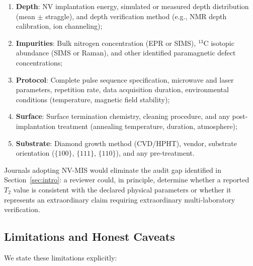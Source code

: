 \documentclass[11pt,a4paper]{article}
\theoremstyle{definition}
\newcommand{\Ttwo}{T_2}
\newcommand{\NV}{NV}
\begin{document}
\begin{enumerate}[label=\textbf{MIS-\arabic*:}, nosep]
    \item \textbf{Depth}: \NV{} implantation energy, simulated or measured
    depth distribution (mean $\pm$ straggle), and depth verification method
    (e.g., NMR depth calibration, ion channeling);
    \item \textbf{Impurities}: Bulk nitrogen concentration (EPR or SIMS),
    ${}^{13}$C isotopic abundance (SIMS or Raman), and other identified
    paramagnetic defect concentrations;
    \item \textbf{Protocol}: Complete pulse sequence specification, microwave
    and laser parameters, repetition rate, data acquisition duration,
    environmental conditions (temperature, magnetic field stability);
    \item \textbf{Surface}: Surface termination chemistry, cleaning procedure,
    and any post-implantation treatment (annealing temperature, duration,
    atmosphere);
    \item \textbf{Substrate}: Diamond growth method (CVD/HPHT), vendor,
    substrate orientation ($\{100\}$, $\{111\}$, $\{110\}$), and any
    pre-treatment.
\end{enumerate}

Journals adopting NV-MIS would eliminate the audit gap identified in
Section~\ref{sec:intro}: a reviewer could, in principle, determine whether
a reported $\Ttwo$ value is consistent with the declared physical parameters
or whether it represents an extraordinary claim requiring extraordinary
multi-laboratory verification.

\subsection{Limitations and Honest Caveats}

We state these limitations explicitly:
\end{document}
